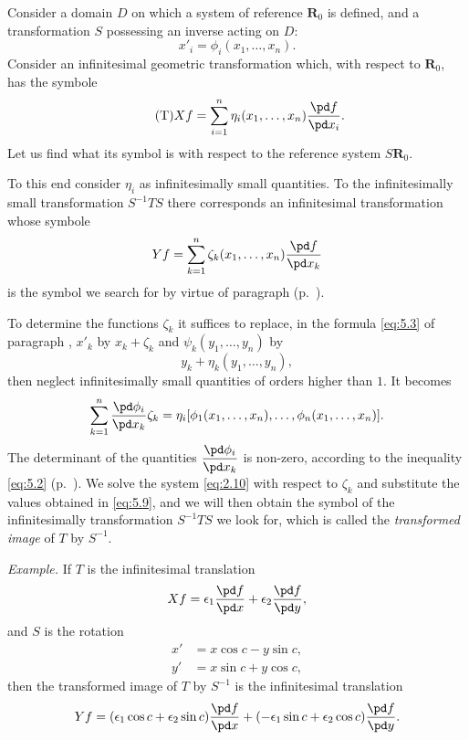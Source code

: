 Consider a domain $D$ on which a system of reference $\mathbf{R}_{0}$ is defined, and a transformation $S$ possessing an inverse acting on $D$:
\begin{equation}
  \label{eq:5.S}\tag{S}
  x'_{i}=\phi_{i}(x_{1},\dots,x_{n}).
\end{equation}
Consider an infinitesimal geometric transformation which, with respect to $\mathbf{R}_{0}$, has the symbole
\begin{equation}
  \label{eq:5.T}\tag{T}
  Xf=\sum_{i=1}^{n}\eta_{i}(x_{1},\dots,x_{n})\frac{\pd f}{\pd x_{i}}.
\end{equation}
Let us find what its symbol is with respect to the reference system $S\mathbf{R}_{0}$.

To this end consider $\eta_{i}$ as infinitesimally small quantities. To the infinitesimally small transformation $S^{-1}TS$ there corresponds an infinitesimal transformation whose symbole
\begin{equation}
  \label{eq:5.9}
  Yf=\sum_{k=1}^{n}\zeta_{k}(x_{1},\dots,x_{n})\frac{\pd f}{\pd x_{k}}
\end{equation}
is the symbol we search for by virtue of paragraph  (p.~\pageref{sec:62}).

To determine the functions $\zeta_{k}$ it suffices to replace, in the formula \eqref{eq:5.3} of paragraph , $x'_{k}$ by $x_{k}+\zeta_{k}$ and $\psi_{k}(y_{1},\dots,y_{n})$ by
\[
y_{k}+\eta_{k}(y_{1},\dots,y_{n}),
\]
then neglect infinitesimally small quantities of orders higher than $1$. It becomes
\begin{equation}
  \label{eq:5.10}
  \sum_{k=1}^{n}\frac{\pd\phi_{i}}{\pd x_{k}}\zeta_{k}=\eta_{i}[\phi_{1}(x_{1},\dots,x_{n}),\dots,\phi_{n}(x_{1},\dots,x_{n})].
\end{equation}
The determinant of the quantities $\dfrac{\pd\phi_{i}}{\pd x_{k}}$ is non-zero, according to the inequality \eqref{eq:5.2} (p.~\pageref{eq:5.2}). We solve the system \eqref{eq:2.10} with respect to $\zeta_{k}$ and substitute the values obtained in \eqref{eq:5.9}, and we will then obtain the symbol of the infinitesimally transformation $S^{-1}TS$ we look for, which is called the \emph{transformed image} of $T$ by $S^{-1}$.

\somespace

{\small
\emph{Example.} If $T$ is the infinitesimal translation
\[
Xf=\epsilon_{1}\frac{\pd f}{\pd x}+\epsilon_{2}\frac{\pd f}{\pd y},
\]
and $S$ is the rotation
\begin{align*}
  x'&=x\cos c-y\sin c,\\
  y'&=x\sin c+y\cos c,
\end{align*}
then the transformed image of $T$ by $S^{-1}$ is the infinitesimal translation
\[
Yf=(\epsilon_{1}\cos c+\epsilon_{2}\sin c)\frac{\pd f}{\pd x}+(-\epsilon_{1}\sin c+\epsilon_{2}\cos c)\frac{\pd f}{\pd y}.
\]}
